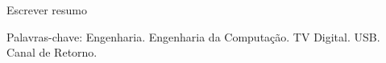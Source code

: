 Escrever resumo

Palavras-chave: Engenharia. Engenharia da Computação. TV Digital. USB. Canal de Retorno.

